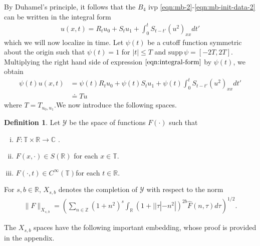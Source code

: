\documentclass[12pt,reqno]{amsart}
\numberwithin{equation}{section}  %
\numberwithin{figure}{section}
\newcommand{\rr}{\mathbb{R}}
\newcommand{\zz}{\mathbb{Z}}
\newcommand{\cc}{\mathbb{C}}
\newcommand{\ci}{\mathbb{T}}
\newcommand{\wh}{\widehat}
\theoremstyle{plain}
\theoremstyle{definition}
\newtheorem{definition}{Definition}
\theoremstyle{remark}
\begin{document}
%
By Duhamel's principle, it
follows that the $B_4$ ivp \eqref{eqn:mb-2}-\eqref{eqn:mb-init-data-2} can
be written in the integral form
%
%
\begin{equation}
  \begin{split}
    u(x,t) = R_{t}u_{0} + S_{t}u_{1} + \int_{0}^{t} S_{t-t'}
    (u^{2})_{xx} dt'
  \end{split}
  \label{eqn:integral-form}
\end{equation}
%
%
which we will now localize in time.
Let $\psi(t)$ be a cutoff function symmetric about the 
origin such that $\psi(t) = 1$ for $|t| \le T$ and $\text{supp} \, \psi 
= [-2T, 2T ]$. Multiplying the right hand side of expression
$\eqref{eqn:integral-form}$ by $\psi(t)$, we obtain
%
%
\begin{equation}
  \begin{split}
    \psi(t) u(x,t)
    & = \psi(t) R_{t} u_{0} + \psi(t) S_{t}u_{1} +
    \psi(t) \int_{0}^{t} S_{t-t'}
    (u^{2})_{xx} dt'
    \\
    & \doteq Tu
  \end{split}
  \label{localized-int-eqn}
\end{equation}
where $T=T_{u_0, u_1}$.We now introduce the following spaces. 
%
%
\begin{definition}
  Let $\mathcal{Y}$ be the space of functions $F(\cdot)$ such that
  \begin{enumerate}[(i)]
   \item{$F: \ci \times \rr \to \cc$ }.
   \item{ $F(x, \cdot) \in S(\rr)$ for each $x \in \ci$}.
   \item{ $F(\cdot, t) \in C^{\infty}(\ci)$for each $t \in \rr$}.
  \end{enumerate}
  For $s, b \in \rr$, $X_{s,b}$ denotes the completion of $\mathcal{Y}$ with
  respect to the norm
  \begin{equation}
  \begin{split}
    \|F\|_{X_{s,b}} = \left( \sum_{n \in \zz} (1 + n^{2})^{s} \int_{\rr}
    (1 + | | \tau | - n^{2} |)^{2b} \wh{F}(n, \tau) d \tau\right)^{1/2}.
  \end{split}
  \label{eqn:bous-norm}
  \end{equation}
\end{definition}
%
The $X_{s,b}$ spaces have the following important embedding, whose proof is
provided in the appendix.
%
%
%
%
%
%
\end{document}
